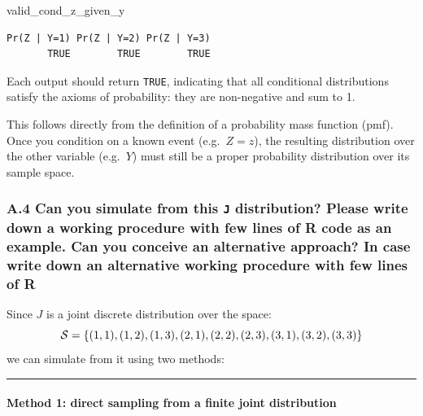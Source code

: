 \documentclass[
]{article}
\newenvironment{Shaded}{\begin{snugshade}}{\end{snugshade}}
\newcommand{\NormalTok}[1]{#1}
\begin{document}
\begin{Shaded}
\begin{Highlighting}[]
\NormalTok{valid\_cond\_z\_given\_y}
\end{Highlighting}
\end{Shaded}

\begin{verbatim}
Pr(Z | Y=1) Pr(Z | Y=2) Pr(Z | Y=3) 
       TRUE        TRUE        TRUE 
\end{verbatim}

Each output should return \texttt{TRUE}, indicating that all conditional
distributions satisfy the axioms of probability: they are non-negative
and sum to 1.

This follows directly from the definition of a probability mass function
(pmf). Once you condition on a known event (e.g.~\(Z = z\)), the
resulting distribution over the other variable (e.g.~\(Y\)) must still
be a proper probability distribution over its sample space.

\bigskip

\subsubsection{\texorpdfstring{A.4 Can you simulate from this \texttt{J}
distribution? Please write down a working procedure with few lines of R
code as an example. Can you conceive an alternative approach? In case
write down an alternative working procedure with few lines of
R}{A.4 Can you simulate from this J distribution? Please write down a working procedure with few lines of R code as an example. Can you conceive an alternative approach? In case write down an alternative working procedure with few lines of R}}\label{a.4-can-you-simulate-from-this-j-distribution-please-write-down-a-working-procedure-with-few-lines-of-r-code-as-an-example.-can-you-conceive-an-alternative-approach-in-case-write-down-an-alternative-working-procedure-with-few-lines-of-r}

Since \(J\) is a joint discrete distribution over the space: \[
{\cal S} = \{(1,1), (1,2), (1,3), (2,1), (2,2), (2,3), (3,1), (3,2), (3,3)\}
\] we can simulate from it using two methods:

\begin{center}\rule{0.5\linewidth}{0.5pt}\end{center}

\paragraph{\texorpdfstring{\textbf{Method 1: direct sampling from a
finite joint
distribution}}{Method 1: direct sampling from a finite joint distribution}}\label{method-1-direct-sampling-from-a-finite-joint-distribution}
\end{document}

